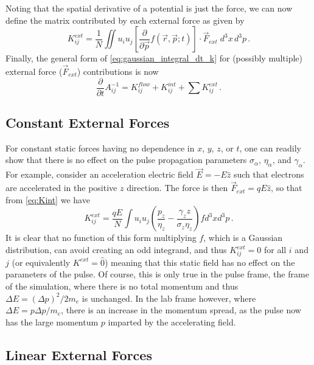 Noting that the spatial derivative of a potential is just the force, we can now define the matrix contributed by each external force as given by
\begin{equation} \label{eq:Kint}
  K^{ext}_{ij} = \frac{1}{N} \iint u_i u_j \left [ \frac{\partial}{\partial \vec{p}} f(\vec{r}, \vec{p}; t) \right ] \cdot \vec{F}_{ext}\;d^{3}x\,d^{3}p \,\text{.}
\end{equation}
Finally, the general form of \ref{eq:gaussian_integral_dt_k} for (possibly multiple) external force ($\vec{F}_{ext}$) contributions is now
\begin{equation}
  \frac{\partial}{\partial t} A^{-1}_{ij} = K^{flow}_{ij} + K^{int}_{ij} + \sum K^{ext}_{ij} \,\text{.}
\end{equation}

\subsection{Constant External Forces} \label{sec:const_force}

For constant static forces having no dependence in $ x $, $ y $, $ z $, or $ t $, one can readily show that there is no effect on the pulse propagation parameters $ \sigma_{ \alpha } $, $ \eta_{ \alpha } $, and $ \gamma_{ \alpha } $.
For example, consider an acceleration electric field $ \vec{E} = -E \hat{z} $ such that electrons are accelerated in the positive $ z $ direction.
The force is then $ \vec{F}_{ext} = qE \hat{z} $, so that from \ref{eq:Kint} we have
\begin{equation}
  K^{ext}_{ij} = \frac{qE} {N} \int{ u_{i} u_{j} \left( \frac{p_{z}} {\eta_{z}} - \frac{\gamma_{z} z} {\sigma_{z} \eta_{z}} \right) f d^{3}x d^{3}p } \,\text{.}
\end{equation}
It is clear that no function of this form multiplying $ f $, which is a Gaussian distribution, can avoid creating an odd integrand, and thus $ K_{ij}^{ext} = 0 $ for all $ i $ and $ j $ (or equivalently $ K^{ext} = \hat{0} $) meaning that this static field has no effect on the parameters of the pulse.
Of course, this is only true in the pulse frame, the frame of the simulation, where there is no total momentum and thus $ \Delta E = \left( \Delta p \right)^{2} / 2 m_{e} $ is unchanged.
In the lab frame however, where  $ \Delta E = p \Delta p / m_{e} $, there is an increase in the momentum spread, as the pulse now has the large momentum $p$ imparted by the accelerating field.

\subsection{Linear External Forces}

